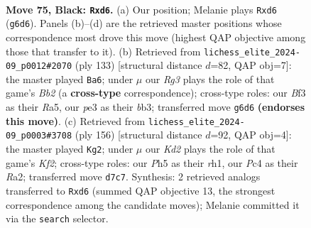 \documentclass[11pt]{article}
\begin{document}
\begin{figure}[p]\centering
\begin{subfigure}{0.46\textwidth}\centering
\resizebox{\linewidth}{!}{%
\newchessgame
\chessboard[
  setfen={8/3k2B1/p2R2rr/Ppp2p1p/2p2P1P/4PbP1/1P3K2/2R5 b - - 0 75},
  showmover=false,
  pgfstyle=straightmove, color=movearrow, markmove={g6-d6}
]}
\caption{}
\end{subfigure}\hfill
\begin{subfigure}{0.46\textwidth}\centering
\resizebox{\linewidth}{!}{%
\newchessgame
\chessboard[
  setfen={r7/1b6/1Pp1kp2/r1Pp4/PK2p2R/1B2P3/3R1P2/8 b - - 0 67},
  showmover=false,
  pgfstyle=straightmove, color=movearrow, markmove={b7-a6}
]}
\caption{}
\end{subfigure}
\\[4pt]
\begin{subfigure}{0.46\textwidth}\centering
\resizebox{\linewidth}{!}{%
\newchessgame
\chessboard[
  setfen={8/p5pn/P2k1p1p/1p1P1R1P/5PP1/1PrB4/R4K2/7r w - - 4 79},
  showmover=false,
  pgfstyle=straightmove, color=movearrow, markmove={f2-g2}
]}
\caption{}
\end{subfigure}\hfill

\caption{\textbf{Move 75, Black: \texttt{Rxd6}.} (a) Our position; Melanie plays \texttt{Rxd6} (\texttt{g6d6}). Panels (b)--(d) are the retrieved master positions whose correspondence most drove this move (highest QAP objective among those that transfer to it). (b) Retrieved from \texttt{lichess\_elite\_2024-09\_p0012\#2070} (ply 133) [structural distance $d$=82, QAP obj=7]: the master played \texttt{Ba6}; under $\mu$ our \emph{Rg3} plays the role of that game's \emph{Bb2} (a \textbf{cross-type} correspondence); cross-type roles: our \emph{B}f3 as their \emph{R}a5, our \emph{p}e3 as their \emph{b}b3; transferred move \texttt{g6d6} \textbf{(endorses this move)}. (c) Retrieved from \texttt{lichess\_elite\_2024-09\_p0003\#3708} (ply 156) [structural distance $d$=92, QAP obj=4]: the master played \texttt{Kg2}; under $\mu$ our \emph{Kd2} plays the role of that game's \emph{Kf2}; cross-type roles: our \emph{P}h5 as their \emph{r}h1, our \emph{P}c4 as their \emph{R}a2; transferred move \texttt{d7c7}. Synthesis: 2 retrieved analogs transferred to \texttt{Rxd6} (summed QAP objective 13, the strongest correspondence among the candidate moves); Melanie committed it via the \texttt{search} selector.}
\label{fig:thought-m149}
\end{figure}

\clearpage
\end{document}
